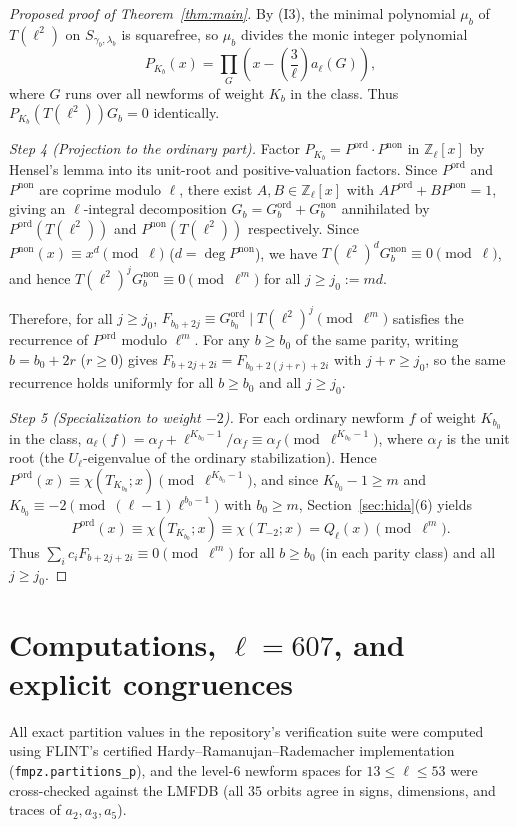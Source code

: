 \documentclass[11pt,reqno]{amsart}
\theoremstyle{definition}
\theoremstyle{remark}
\newcommand{\Z}{\mathbb{Z}}
\newcommand{\legendre}[2]{\left(\frac{#1}{#2}\right)}
\newcommand{\ord}{\mathrm{ord}}
\newcommand{\non}{\mathrm{non}}
\begin{document}
\begin{proof}[Proposed proof of Theorem~\ref{thm:main}]
By (I3), the minimal polynomial $\mu_b$ of $T(\ell^2)$ on $S_{\gamma_b,\lambda_b}$ is squarefree, so $\mu_b$ divides the monic integer polynomial
\[
  P_{K_b}(x) = \prod_{G} \left(x - \legendre{3}{\ell} a_\ell(G)\right),
\]
where $G$ runs over all newforms of weight $K_b$ in the class. Thus $P_{K_b}(T(\ell^2)) G_b = 0$ identically.

\emph{Step 4 (Projection to the ordinary part).} Factor $P_{K_b} = P^\ord \cdot P^\non$ in $\Z_\ell[x]$ by Hensel's lemma into its unit-root and positive-valuation factors. Since $P^\ord$ and $P^\non$ are coprime modulo $\ell$, there exist $A, B \in \Z_\ell[x]$ with $A P^\ord + B P^\non = 1$, giving an $\ell$-integral decomposition $G_b = G_b^\ord + G_b^\non$ annihilated by $P^\ord(T(\ell^2))$ and $P^\non(T(\ell^2))$ respectively. Since $P^\non(x) \equiv x^d \pmod{\ell}$ ($d = \deg P^\non$), we have $T(\ell^2)^d G_b^\non \equiv 0 \pmod{\ell}$, and hence $T(\ell^2)^j G_b^\non \equiv 0 \pmod{\ell^m}$ for all $j \ge j_0 := m d$.

Therefore, for all $j \ge j_0$, $F_{b_0 + 2j} \equiv G_{b_0}^\ord \mid T(\ell^2)^j \pmod{\ell^m}$ satisfies the recurrence of $P^\ord$ modulo $\ell^m$. For any $b \ge b_0$ of the same parity, writing $b = b_0 + 2r$ ($r \ge 0$) gives $F_{b+2j+2i} = F_{b_0 + 2(j+r) + 2i}$ with $j + r \ge j_0$, so the same recurrence holds uniformly for all $b \ge b_0$ and all $j \ge j_0$.

\emph{Step 5 (Specialization to weight $-2$).} For each ordinary newform $f$ of weight $K_{b_0}$ in the class, $a_\ell(f) = \alpha_f + \ell^{K_{b_0}-1}/\alpha_f \equiv \alpha_f \pmod{\ell^{K_{b_0}-1}}$, where $\alpha_f$ is the unit root (the $U_\ell$-eigenvalue of the ordinary stabilization). Hence $P^\ord(x) \equiv \chi(T_{K_{b_0}}; x) \pmod{\ell^{K_{b_0}-1}}$, and since $K_{b_0} - 1 \ge m$ and $K_{b_0} \equiv -2 \pmod{(\ell-1)\ell^{b_0-1}}$ with $b_0 \ge m$, Section~\ref{sec:hida}(6) yields
\[
  P^\ord(x) \equiv \chi(T_{K_{b_0}}; x) \equiv \chi(T_{-2}; x) = Q_\ell(x) \pmod{\ell^m}.
\]
Thus $\sum_i c_i F_{b+2j+2i} \equiv 0 \pmod{\ell^m}$ for all $b \ge b_0$ (in each parity class) and all $j \ge j_0$.
\end{proof}

\section{Computations, $\ell = 607$, and explicit congruences}\label{sec:comp}

All exact partition values in the repository's verification suite were computed using FLINT's certified Hardy--Ramanujan--Rademacher implementation (\texttt{fmpz.partitions\_p}), and the level-$6$ newform spaces for $13 \le \ell \le 53$ were cross-checked against the LMFDB (all $35$ orbits agree in signs, dimensions, and traces of $a_2, a_3, a_5$).
\end{document}
